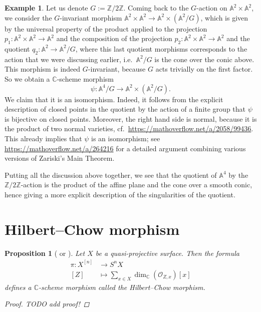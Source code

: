 \documentclass[12pt,a4paper]{amsart}
\theoremstyle{plain}
\newtheorem{prop}[thm]{Proposition}
\theoremstyle{definition}
\newtheorem{exmp}[thm]{Example}
\theoremstyle{remark}
\begin{document}
\begin{exmp}
  Let us denote $G := \mathbb{Z}/2\mathbb{Z}$.
  Coming back to the $G$-action on $\mathbb{A}^{2} \times \mathbb{A}^{2}$, we consider the $G$-invariant morphism $\mathbb{A}^{2} \times \mathbb{A}^{2} \to \mathbb{A}^{2} \times (\mathbb{A}^{2}/G)$, which is given by the universal property of the product applied to the projection $p_{1} \colon \mathbb{A}^{2} \times \mathbb{A}^{2} \to \mathbb{A}^{2}$ and the composition of the projection $p_{2} \colon \mathbb{A}^{2} \times \mathbb{A}^{2} \to \mathbb{A}^{2}$ and the quotient $q_{2} \colon \mathbb{A}^{2} \to \mathbb{A}^{2}/G$, where this last quotient morphisms corresponds to the action that we were discussing earlier, i.e.~$\mathbb{A}^{2}/G$ is the cone over the conic above.
  This morphism is indeed $G$-invariant, because $G$ acts trivially on the first factor.
  So we obtain a $\mathbb{C}$-scheme morphism
  \[ \psi \colon \mathbb{A}^{4}/G \to \mathbb{A}^{2} \times (\mathbb{A}^{2}/G). \]
  We claim that it is an isomorphism.
  Indeed, it follows from the explicit description of closed points in the quotient by the action of a finite group that $\psi$ is bijective on closed points.
  Moreover, the right hand side is normal, because it is the product of two normal varieties, cf.~\url{https://mathoverflow.net/a/2058/99436}.
  This already implies that $\psi$ is an isomorphism; see \url{https://mathoverflow.net/a/264216} for a detailed argument combining various versions of Zariski's Main Theorem.

  Putting all the discussion above together, we see that the quotient of $\mathbb{A}^{4}$ by the $\mathbb{Z}/2\mathbb{Z}$-action is the product of the affine plane and the cone over a smooth conic, hence giving a more explicit description of the singularities of the quotient.
\end{exmp}

\section{Hilbert--Chow morphism}

\begin{prop}[{\cite[\S 3.2]{leh00} or \cite[p.~41]{ber08}}]
  Let $X$ be a quasi-projective surface.
  Then the formula
  \begin{align*}
    \pi \colon X^{[n]} & \longrightarrow S^{n}X \\
    [Z] & \longmapsto \sum_{x \in X} \dim_{\mathbb{C}}(\mathscr{O}_{Z,x})[x] 
  \end{align*}
  defines a $\mathbb{C}$-scheme morphism called the \textit{Hilbert--Chow morphism}.
  
  \begin{proof}
    \color{red}
    TODO add proof!
    \color{black}
  \end{proof}
\end{prop}
\end{document}
